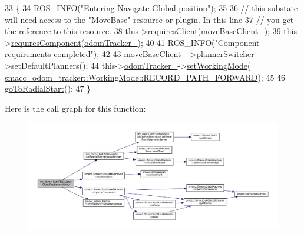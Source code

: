 \begin{DoxyCode}
33   \{
34     ROS\_INFO(\textcolor{stringliteral}{"Entering Navigate Global position"});
35 
36     \textcolor{comment}{// this substate will need access to the "MoveBase" resource or plugin. In this line}
37     \textcolor{comment}{// you get the reference to this resource.}
38     this->\hyperlink{classsmacc_1_1SmaccSubStateBehavior_ae8361a9e794b02f9f3d962b881e4fd7d}{requiresClient}(\hyperlink{classsm__dance__bot_1_1SbNavigateGlobalPosition_a61ddf443ec0ccc460ae594d35c50ac7f}{moveBaseClient\_});
39     this->\hyperlink{classsmacc_1_1SmaccSubStateBehavior_a9f31f62f886cc06017e92fa0d834b12d}{requiresComponent}(\hyperlink{classsm__dance__bot_1_1SbNavigateGlobalPosition_a71058189c1f73baf77073ff1a64ff5ea}{odomTracker\_});
40 
41     ROS\_INFO(\textcolor{stringliteral}{"Component requirements completed"});
42 
43     \hyperlink{classsm__dance__bot_1_1SbNavigateGlobalPosition_a61ddf443ec0ccc460ae594d35c50ac7f}{moveBaseClient\_}->\hyperlink{classsmacc_1_1SmaccMoveBaseActionClient_ae24164268108abf0b35cf51bfba5ec67}{plannerSwitcher\_}->setDefaultPlanners();
44     this->\hyperlink{classsm__dance__bot_1_1SbNavigateGlobalPosition_a71058189c1f73baf77073ff1a64ff5ea}{odomTracker\_}->\hyperlink{classsmacc__odom__tracker_1_1OdomTracker_a38fbca999297c46dc95628cc60851a45}{setWorkingMode}(
      \hyperlink{namespacesmacc__odom__tracker_ade9730dd5cc10ccfad9362176cf46c33a989d06a586bcf9520889228da7faa643}{smacc\_odom\_tracker::WorkingMode::RECORD\_PATH\_FORWARD});
45 
46     \hyperlink{classsm__dance__bot_1_1SbNavigateGlobalPosition_ab923d1e3c346506417d18f0ebbfd33ec}{goToRadialStart}();
47   \}
\end{DoxyCode}


Here is the call graph for this function\+:
\nopagebreak
\begin{figure}[H]
\begin{center}
\leavevmode
\includegraphics[width=350pt]{classsm__dance__bot_1_1SbNavigateGlobalPosition_af5bbe5fa0319ba2f8e5e3cbd40527a43_cgraph}
\end{center}
\end{figure}


